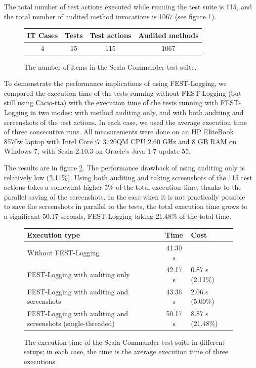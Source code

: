 The total number of test actions executed while running the test suite is 115, and the total number of audited method invocations is 1067 (see figure \ref{fig:stats-scomm-test-suite}).

\begin{figure}[h!]
\centering
\begin{tabular}{|c|c|c|c|} \hline
  IT Cases & Tests & Test actions & Audited methods \\ \hline
  4 & 15 & 115 & 1067 \\ \hline
\end{tabular}
\vspace{10px}
\caption{The number of items in the Scala Commander test suite.}
\label{fig:stats-scomm-test-suite}
\end{figure}

To demonstrate the performance implications of using FEST-Logging, we compared the execution time of the tests running without FEST-Logging (but still using Cacio-tta) with the execution time of the tests running with FEST-Logging in two modes: with method auditing only, and with both auditing and screenshots of the test actions. In each case, we used the average execution time of three consecutive runs. All measurements were done on an HP EliteBook 8570w laptop with Intel Core i7 3720QM CPU 2.60 GHz and 8 GB RAM on Windows 7, with Scala 2.10.3 on Oracle's Java 1.7 update 55. 

The results are in figure \ref{fig:stats-scomm-test-suite-executions}. The performance drawback of using auditing only is relatively low (2.11\%). Using both auditing and taking screenshots of the 115 test actions takes a somewhat higher 5\% of the total execution time, thanks to the parallel saving of the screenshots. In the case when it is not practically possible to save the screenshots in parallel to the tests, the total execution time grows to a significant 50.17 seconds, FEST-Logging taking 21.48\% of the total time.

\begin{figure}[h!]
\centering
\begin{tabular}{|l|c|l|} \hline
  \textbf{Execution type} & \textbf{Time} & \textbf{Cost} \\ \hline \hline
  Without FEST-Logging & 41.30 s & \\ \hline
  FEST-Logging with auditing only & 42.17 s & 0.87 s (2.11\%) \\ \hline 
  FEST-Logging with auditing and screenshots & 43.36 s & 2.06 s (5.00\%) \\ \hline
  FEST-Logging with auditing and screenshots (single-threaded) & 50.17 s & 8.87 s (21.48\%) \\ \hline
\end{tabular}
\vspace{10px}
\caption{The execution time of the Scala Commander test suite in different setups; in each case, the time is the average execution time of three executions.}
\label{fig:stats-scomm-test-suite-executions}
\end{figure}


